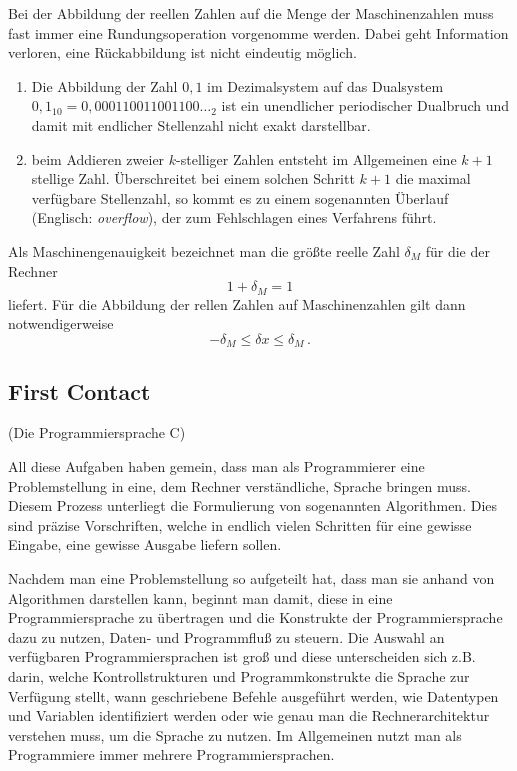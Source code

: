 Bei der Abbildung der reellen Zahlen auf die Menge der Maschinenzahlen
muss fast immer eine Rundungsoperation vorgenomme werden. Dabei geht
Information verloren, eine Rückabbildung ist nicht eindeutig möglich.

\begin{framed}
  \begin{enumerate}
  \item Die Abbildung der Zahl $0,1$ im Dezimalsystem auf das
    Dualsystem $0,1_{10} = 0,000110011001100\ldots_2$ ist ein unendlicher
    periodischer Dualbruch und damit mit endlicher Stellenzahl nicht
    exakt darstellbar.
  \item beim Addieren zweier $k$-stelliger Zahlen entsteht im
    Allgemeinen eine $k+1$ stellige Zahl. Überschreitet bei einem
    solchen Schritt $k+1$ die maximal verfügbare Stellenzahl, so kommt
    es zu einem sogenannten Überlauf (Englisch: \emph{overflow}), der
    zum Fehlschlagen eines Verfahrens führt.
  \end{enumerate}
\end{framed}

Als Maschinengenauigkeit bezeichnet man die größte reelle Zahl
$\delta_M$ für die der Rechner
\begin{equation}
1 + \delta_M = 1
\end{equation}
liefert. Für die Abbildung der rellen Zahlen auf Maschinenzahlen gilt
dann notwendigerweise
\begin{equation}
-\delta_M \leq \delta x\leq \delta_M\,.
\end{equation}

\subsection{First Contact}

\iflecturer
\begin{framed}
  
  \slide{} (Die Programmiersprache C)
\end{framed}
\fi

All diese Aufgaben haben gemein, dass man als Programmierer eine Problemstellung in eine, dem Rechner verständliche, Sprache bringen muss.
Diesem Prozess unterliegt die Formulierung von sogenannten Algorithmen.
Dies sind präzise Vorschriften, welche in endlich vielen Schritten für eine gewisse Eingabe, eine gewisse Ausgabe liefern sollen.

Nachdem man eine Problemstellung so aufgeteilt hat, dass man sie anhand von Algorithmen darstellen kann, beginnt man damit, diese in eine Programmiersprache zu übertragen und die Konstrukte der Programmiersprache dazu zu nutzen, Daten- und Programmfluß zu steuern.
Die Auswahl an verfügbaren Programmiersprachen ist groß und diese unterscheiden sich z.B. darin, welche Kontrollstrukturen und Programmkonstrukte die Sprache zur Verfügung stellt, wann geschriebene Befehle ausgeführt werden, wie Datentypen und Variablen identifiziert werden oder wie genau man die Rechnerarchitektur verstehen muss, um die Sprache zu nutzen.
Im Allgemeinen nutzt man als Programmiere immer mehrere Programmiersprachen.

